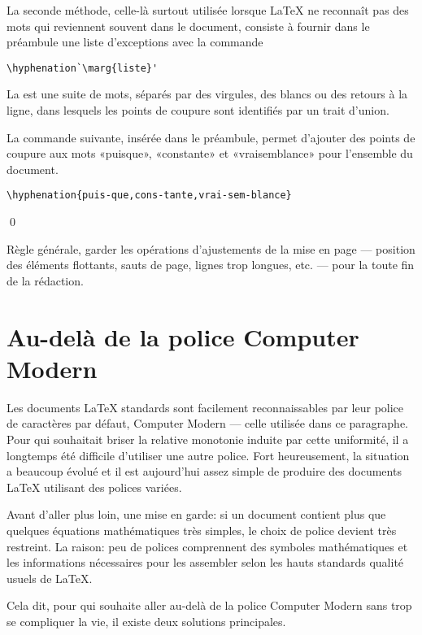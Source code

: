 La seconde méthode, celle-là surtout utilisée lorsque {\LaTeX} ne
reconnaît pas des mots qui reviennent souvent dans le document,
consiste à fournir dans le préambule une liste d'exceptions avec la
commande
\begin{lstlisting}
\hyphenation`\marg{liste}'
\end{lstlisting}
La  est une suite de mots, séparés par des virgules, des
blancs ou des retours à la ligne, dans lesquels les points de coupure
sont identifiés par un trait d'union.

\begin{exemple}
  La commande suivante, insérée dans le préambule, permet d'ajouter
  des points de coupure aux mots «puisque», «constante» et
  «vraisemblance» pour l'ensemble du document.
\begin{lstlisting}
\hyphenation{puis-que,cons-tante,vrai-sem-blance}
\end{lstlisting}
  \qed
\end{exemple}

\begin{important}
  Règle générale, garder les opérations d'ajustements de la mise en
  page --- position des éléments flottants, sauts de page, lignes trop
  longues, etc. --- pour la toute fin de la rédaction.
\end{important}


\section{Au-delà de la police Computer Modern}
\label{sec:trucs:polices}

{\CM%
  Les documents {\LaTeX} standards sont facilement reconnaissables par
  leur police de caractères par défaut, Computer Modern --- celle
  utilisée dans ce paragraphe. Pour qui souhaitait briser la relative
  monotonie induite par cette uniformité, il a longtemps été difficile
  d'utiliser une autre police. Fort heureusement, la situation a
  beaucoup évolué et il est aujourd'hui assez simple de produire des
  documents {\LaTeX} utilisant des polices variées.}

Avant d'aller plus loin, une mise en garde: si un document contient
plus que quelques équations mathématiques très simples, le choix de
police devient très restreint. La raison: peu de polices comprennent
des symboles mathématiques et les informations nécessaires pour les
assembler selon les hauts standards qualité usuels de {\LaTeX}.

Cela dit, pour qui souhaite aller au-delà de la police Computer Modern
sans trop se compliquer la vie, il existe deux solutions principales.

